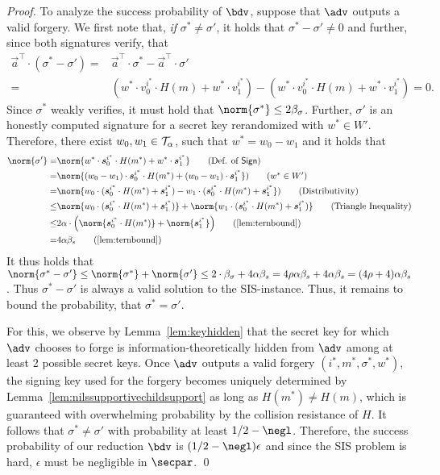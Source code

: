 \begin{proof}
  To analyze the success probability of $\bdv$, suppose that $\adv$ outputs a valid forgery.
  We first note that, \emph{if} $\sigma^* \neq \sigma'$, it holds that $\sigma^*-\sigma'\neq 0$ and further, since both signatures verify, that 
  \begin{align*}
       \vec{a}^\intercal\cdot(\sigma^*-\sigma') =& \vec{a}^\intercal\cdot\sigma^*-\vec{a}^\intercal\cdot\sigma'\\ 
    =& (w^*\cdot v^{i^*}_0\cdot H(m) + w^*\cdot v^{i^*}_1) - (w^*\cdot v^{i^*}_0\cdot H(m) + w^*\cdot v^{i^*}_1) = 0.
  \end{align*}
  Since $\sigma^*$ weakly verifies, it must hold that $\norm{\sigma^*} \leq 2\beta_\sigma$.
  Further, $\sigma'$ is an honestly computed signature for a secret key rerandomized with $w^*\in W'$.
  Therefore, there exist $w_0,w_1 \in \mathcal{T}_\alpha$, such that $w^* = w_0-w_1$ and it holds that
  \begin{align*}
    \norm{\sigma'} =& \norm{w^*\cdot\vec{s}^{i^*}_0\cdot H(m^*)+ w^*\cdot\vec{s}^{i^*}_1}\tag{Def. of $\sign$}\\
    =& \norm{(w_0-w_1)\cdot\vec{s}^{i^*}_0\cdot H(m^*)+ (w_0-w_1)\cdot\vec{s}^{i^*}_1})\tag{$w^*\in W'$}\\
    =& \norm{w_0\cdot(\vec{s}^{i^*}_0\cdot H(m^*)+ \vec{s}^{i^*}_1) - w_1\cdot(\vec{s}^{i^*}_0\cdot H(m^*)+ \vec{s}^{i^*}_1})\tag{Distributivity}\\
    \leq& \norm{w_0\cdot(\vec{s}^{i^*}_0\cdot H(m^*)+ \vec{s}^{i^*}_1)} + \norm{w_1\cdot(\vec{s}^{i^*}_0\cdot H(m^*)+ \vec{s}^{i^*}_1)}\tag{Triangle Inequality}\\
    \leq & 2\alpha \cdot \Bigl(\norm{\vec{s}^{i^*}_0\cdot H(m^*)}+ \norm{\vec{s}^{i^*}_1}\Bigr)\tag{\autoref{lem:ternbound}}\\
    = & 4\alpha\beta_s \tag{\autoref{lem:ternbound}}
  \end{align*}
  It thus holds that $\norm{\sigma^*-\sigma'} \leq \norm{\sigma^*}+\norm{\sigma'} \leq 2\cdot\beta_\sigma + 4\alpha\beta_s = 4\rho\alpha\beta_s + 4\alpha\beta_s  = (4\rho + 4)\alpha\beta_s$. Thus $\sigma^*-\sigma'$ is always a valid solution to the SIS-instance.
Thus, it remains to bound the probability, that $\sigma^*=\sigma'$.

For this, we observe by Lemma~\ref{lem:keyhidden} that the secret key for which $\adv$ chooses to forge is information-theoretically hidden from $\adv$ among at least 2 possible secret keys.
Once $\adv$ outputs a valid forgery $(i^*,m^*,\sigma^*,w^*)$, the signing key used for the forgery becomes uniquely determined by Lemma~\ref{lem:nilssupportivechildsupport} as long as $H(m^*)\neq H(m)$, which is guaranteed with overwhelming probability by the collision resistance of $H$.
It follows that $\sigma^* \neq \sigma'$ with probability at least $1/2 - \negl$.
Therefore, the success probability of our reduction $\bdv$ is $(1/2 - \negl) \epsilon$ and since the SIS problem is hard, $\epsilon$ must be negligible in $\secpar$. 
\qed
  
\end{proof}

